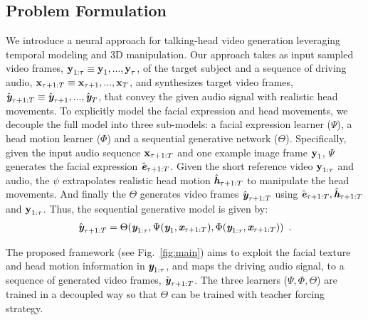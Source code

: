 \documentclass[runningheads]{llncs}
\def\mathbi#1{\textbf{\em #1}}
\begin{document}
\subsection{Problem Formulation}
\label{subsec:problem_formulation}
We introduce a neural approach for talking-head video generation leveraging temporal modeling and 3D manipulation. Our approach takes as input sampled video frames, $\mathbi{\mathbi{y}}_{1:\tau} \equiv \mathbi{\mathbi{y}}_1,...,\mathbi{\mathbi{y}}_{\tau}$, of the target subject and a sequence of driving audio, $\mathbi{\mathbi{x}}_{\tau+ 1:T}  \equiv \mathbi{\mathbi{x}}_{\tau + 1},...,\mathbi{\mathbi{x}}_T$, and synthesizes target video frames, $\hat{\mathbi{y}}_{\tau + 1:T}  \equiv \hat{\mathbi{y}}_{\tau + 1}, ...,\hat{\mathbi{y}}_T$, that convey the given audio signal with realistic head movements. To explicitly model the facial expression and head movements, we decouple the full model into three sub-models: a facial expression learner ($\Psi$), a head motion learner ($\Phi$) and a sequential generative network ($\Theta$). Specifically, given the input audio sequence $\mathbi{\mathbi{x}}_{\tau+ 1:T}$ and one example image frame $\mathbi{\mathbi{y}}_{1}$, $\Psi$ generates the facial expression $\hat{\mathbi{e}}_{\tau+1: T}$. Given the short reference video $\mathbi{\mathbi{y}}_{1:\tau}$ and audio, the $\psi$ extrapolates realistic head motion $\hat{\mathbi{h}}_{\tau + 1:T}$ to manipulate the head movements. And finally the $\Theta$ generates video frames $\hat{\mathbi{y}}_{\tau + 1:T}$ using $\hat{\mathbi{e}}_{\tau+1: T}, \hat{\mathbi{h}}_{\tau+1: T}$ and $\mathbi{\mathbi{y}}_{1:\tau}$.  Thus, the sequential generative model is given by:
\begin{equation}
\begin{aligned}
\hat{\mathbi{y}}_{ \tau+1:T} =  \Theta( \mathbi{y}_{1:\tau},\Psi( \mathbi{y}_{1} , \mathbi{x}_{\tau +1:T} ), \Phi(\mathbi{y}_{1:\tau},\mathbi{x}_{\tau +1:T} )  )  \enspace.
\end{aligned}
\label{eq:training}    
\end{equation}

The proposed framework (see Fig.~\ref{fig:main}) aims to exploit the facial texture and head motion information in $\mathbi{y}_{1:\tau}$, and maps the driving audio signal, to a sequence of generated video frames, $\hat{\mathbi{y}}_{ \tau+1:T}$. The three learners ($\Psi, \Phi, \Theta$) are trained in a decoupled way so that $\Theta$ can be trained with teacher forcing strategy. 
\end{document}
